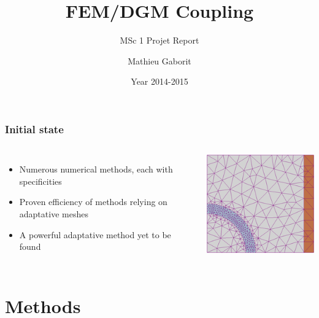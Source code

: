 \documentclass[10pt, compress]{beamer}
\title{FEM/DGM Coupling}
\subtitle{MSc 1 Projet Report}
\date{Year 2014-2015}
\author{Mathieu Gaborit}
\institute{Université du Maine}
\begin{document}
\maketitle

\begin{frame}[fragile]
  \frametitle{Initial state}
  \begin{columns}[onlytextwidth]

      \begin{itemize}
        \item Numerous numerical methods, each with specificities
        \item Proven efficiency of methods relying on adaptative meshes
        \item A powerful adaptative method yet to be found
      \end{itemize}

    \centering
        \includegraphics[width=\textwidth]{mesh.png}
  \end{columns}

\end{frame}

\section{Methods}
\end{document}
